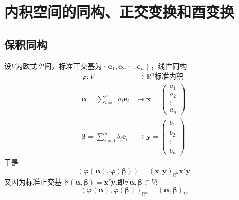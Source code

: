 \newpage
\section{内积空间的同构、正交变换和酉变换}
\subsection{保积同构}
设$V$为欧式空间，标准正交基为$\left\{
    \bm{e}_1,\bm{e}_2,\cdots,\bm{e}_n
    \right\}$，线性同构\begin{align*}
    \bm{\varphi}:V                        & \longrightarrow\mathbb{R}^n\text{标准内积}  \\
    \bm{\alpha}=\sum_{i=1}^{n}a_i\bm{e}_i & \longmapsto\bm{x}=\begin{pmatrix}
                                                                  a_1 \\a_2\\\vdots\\a_n
                                                              \end{pmatrix} \\
    \bm{\beta}=\sum_{i=1}^{n}b_i\bm{e}_i  & \longmapsto\bm{y}=\begin{pmatrix}
                                                                  b_1 \\b_2\\\vdots\\b_n
                                                              \end{pmatrix}
\end{align*}于是\[
    \left(
    \bm{\varphi}\left(\bm{\alpha}\right),\bm{\varphi}\left(\bm{\beta}\right)
    \right)=\left(
    \bm{x},\bm{y}
    \right)_{\mathbb{R}^n}\bm{x}'\bm{y}
\]又因为标准正交基下$\left(
    \bm{\alpha},\bm{\beta}
    \right)=\bm{x}'\bm{y}$.即$\forall\bm{\alpha},\bm{\beta}\in V:$\[
    \left(
    \bm{\varphi}\left(\bm{\alpha}\right),\bm{\varphi}\left(\bm{\beta}\right)
    \right)_{\mathbb{R}^n}=\left(
    \bm{\alpha},\bm{\beta}
    \right)_V
\]

